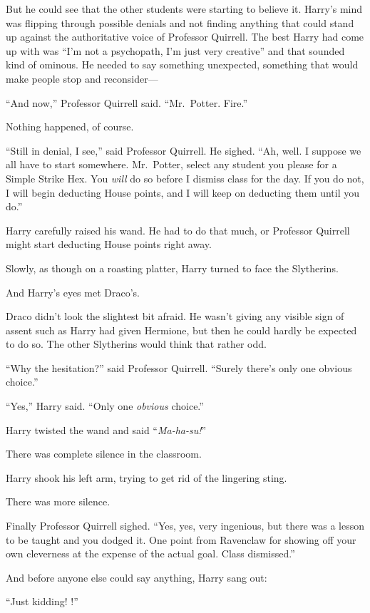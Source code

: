 But he could see that the other students were starting to believe it. Harry’s mind was flipping through possible denials and not finding anything that could stand up against the authoritative voice of Professor Quirrell. The best Harry had come up with was “I’m not a psychopath, I’m just very creative” and that sounded kind of ominous. He needed to say something unexpected, something that would make people stop and reconsider—

“And now,” Professor Quirrell said. “Mr.~Potter. Fire.”

Nothing happened, of course.

“Still in denial, I see,” said Professor Quirrell. He sighed. “Ah, well. I suppose we all have to start somewhere. Mr.~Potter, select any student you please for a Simple Strike Hex. You \emph{will} do so before I dismiss class for the day. If you do not, I will begin deducting House points, and I will keep on deducting them until you do.”

Harry carefully raised his wand. He had to do that much, or Professor Quirrell might start deducting House points right away.

Slowly, as though on a roasting platter, Harry turned to face the Slytherins.

And Harry’s eyes met Draco’s.

Draco didn’t look the slightest bit afraid. He wasn’t giving any visible sign of assent such as Harry had given Hermione, but then he could hardly be expected to do so. The other Slytherins would think that rather odd.

“Why the hesitation?” said Professor Quirrell. “Surely there’s only one obvious choice.”

“Yes,” Harry said. “Only one \emph{obvious} choice.”

Harry twisted the wand and said “\emph{Ma-ha-su!}”

There was complete silence in the classroom.

Harry shook his left arm, trying to get rid of the lingering sting.

There was more silence.

Finally Professor Quirrell sighed. “Yes, yes, very ingenious, but there was a lesson to be taught and you dodged it. One point from Ravenclaw for showing off your own cleverness at the expense of the actual goal. Class dismissed.”

And before anyone else could say anything, Harry sang out:

“Just kidding! !”

